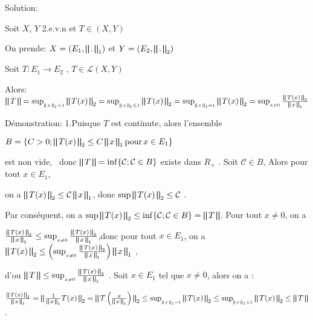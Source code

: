\documentclass{article}
\begin{document}
Solution:

Soit $X$, $Y$ 2.e.v.n et $T \in (X, Y)$

On prende: $X = \left( E_1, \bigparallel . \bigparallel_1 \right)$ et $Y =
\left( E_2, \bigparallel . \bigparallel_2 \right)$

Soit $T : E_1 \rightarrow E_2$ , $T \in \mathcal{L} (X, Y)$

Alors: $\bigparallel T \bigparallel = \sup_{_{\bigparallel x \bigparallel_1 <
1}}  \bigparallel T (x) \bigparallel_2 = \sup_{_{\bigparallel x \bigparallel_1
\leqslant 1}} \bigparallel T (x) \bigparallel_2 = \sup_{_{\bigparallel x
\bigparallel_1 = 1}} \bigparallel T (x) \bigparallel_2 = \sup_{_{x \neq 0}} 
\frac{\bigparallel T (x) \bigparallel_2}{\bigparallel x \bigparallel_1}$

D{\'e}monstration: 1.Puisque $T$ est continute, alors l'ensemble

{\hspace{8em}}$B = \left\{ C > 0 ; \bigparallel T (x) \bigparallel_2 \leq C
\bigparallel x \bigparallel_1 \ensuremath{\operatorname{pour}}x \in E_1
\right\}$

est non vide, \ donc $\bigparallel T \bigparallel = \inf \{ \mathcal{C};
\mathcal{C} \in B \}$ existe dans ${R_+} $ . Soit $\mathcal{C} \in B$, Alors
pour tout $x \in E_1$,

on a $\bigparallel T (x) \bigparallel_2 \leq \mathcal{C} \bigparallel x
\bigparallel_1$, donc $\sup \bigparallel T (x) \bigparallel_2 \leq
\mathcal{C}$ .

Par cons{\'e}quent, on a $\sup \bigparallel T (x) \bigparallel_2 \leq \inf \{
\mathcal{C}; \mathcal{C} \in B \} = \bigparallel T \bigparallel$. Pour tout $x
\neq 0$, on a

$\frac{\bigparallel T (x) \bigparallel_2}{\bigparallel x \bigparallel_1} \leq
\sup_{_{x \neq 0}} \frac{\bigparallel T (x) \bigparallel_2}{\bigparallel x
\bigparallel_1} $,donc pour tout $x \in E_1$, on a $\bigparallel T (x)
\bigparallel_2 \leq \left( \sup_{_{x \neq 0}}  \frac{\bigparallel T (x)
\bigparallel_2}{\bigparallel x \bigparallel_1} \right)  \bigparallel x
\bigparallel_1$ ,

d'ou $\bigparallel T \bigparallel \leq \sup_{_{x \neq 0}}  \frac{\bigparallel
T (x) \bigparallel_2}{\bigparallel x \bigparallel_1}$ . Soit $x \in E_1$ tel
que $x \neq 0$, alors on a :

$\frac{\bigparallel T (x) \bigparallel_2}{\bigparallel x \bigparallel_1} =
\bigparallel \frac{1}{\bigparallel x \bigparallel_1} T (x) \bigparallel_2 =
\bigparallel T \left( \frac{x}{\bigparallel x \bigparallel_1} \right)
\bigparallel_2 \leq \sup_{_{\bigparallel x \bigparallel_1 = 1}}  \bigparallel
T (x) \bigparallel_2 \leq \sup_{_{\bigparallel x \bigparallel_1 \leqslant 1}} 
\bigparallel T (x) \bigparallel_2 \leq \bigparallel T \bigparallel$.
\end{document}
